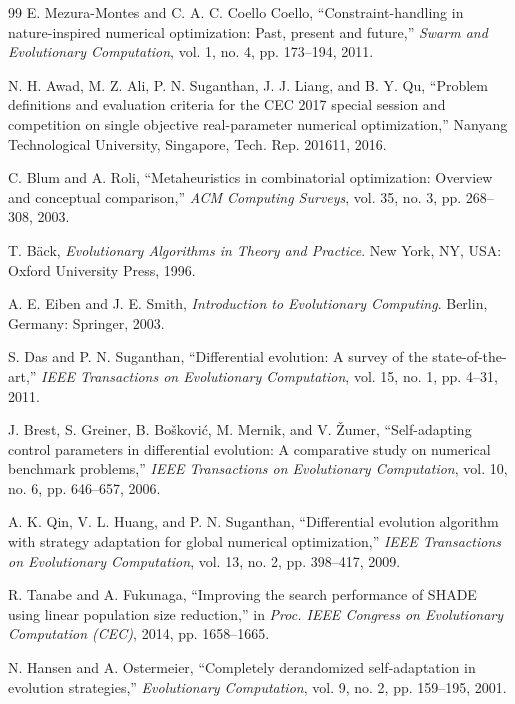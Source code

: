\documentclass[journal]{IEEEtran}
\begin{document}
\begin{thebibliography}{99}
E. Mezura-Montes and C. A. C. Coello Coello, ``Constraint-handling in nature-inspired numerical optimization: Past, present and future,'' \emph{Swarm and Evolutionary Computation}, vol. 1, no. 4, pp. 173--194, 2011.

N. H. Awad, M. Z. Ali, P. N. Suganthan, J. J. Liang, and B. Y. Qu, ``Problem definitions and evaluation criteria for the CEC 2017 special session and competition on single objective real-parameter numerical optimization,'' Nanyang Technological University, Singapore, Tech. Rep. 201611, 2016.

C. Blum and A. Roli, ``Metaheuristics in combinatorial optimization: Overview and conceptual comparison,'' \emph{ACM Computing Surveys}, vol. 35, no. 3, pp. 268--308, 2003.

T. B{\"a}ck, \emph{Evolutionary Algorithms in Theory and Practice}. New York, NY, USA: Oxford University Press, 1996.

A. E. Eiben and J. E. Smith, \emph{Introduction to Evolutionary Computing}. Berlin, Germany: Springer, 2003.

S. Das and P. N. Suganthan, ``Differential evolution: A survey of the state-of-the-art,'' \emph{IEEE Transactions on Evolutionary Computation}, vol. 15, no. 1, pp. 4--31, 2011.

J. Brest, S. Greiner, B. Bo\v{s}kovi\'{c}, M. Mernik, and V. \v{Z}umer, ``Self-adapting control parameters in differential evolution: A comparative study on numerical benchmark problems,'' \emph{IEEE Transactions on Evolutionary Computation}, vol. 10, no. 6, pp. 646--657, 2006.

A. K. Qin, V. L. Huang, and P. N. Suganthan, ``Differential evolution algorithm with strategy adaptation for global numerical optimization,'' \emph{IEEE Transactions on Evolutionary Computation}, vol. 13, no. 2, pp. 398--417, 2009.

R. Tanabe and A. Fukunaga, ``Improving the search performance of SHADE using linear population size reduction,'' in \emph{Proc. IEEE Congress on Evolutionary Computation (CEC)}, 2014, pp. 1658--1665.

N. Hansen and A. Ostermeier, ``Completely derandomized self-adaptation in evolution strategies,'' \emph{Evolutionary Computation}, vol. 9, no. 2, pp. 159--195, 2001.


\end{thebibliography}
\end{document}
